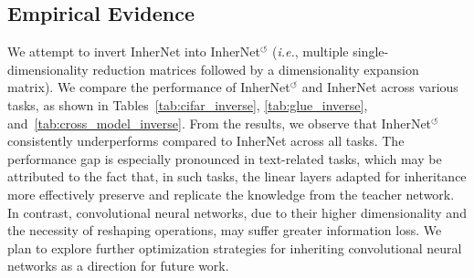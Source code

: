 \documentclass{article} %
\begin{document}
\subsection{Empirical Evidence}
\label{sec:evidence}

We attempt to invert InherNet into InherNet$^{\circlearrowleft}$ (\textit{i.e.}, multiple single-dimensionality reduction matrices followed by a dimensionality expansion matrix). We compare the performance of InherNet$^{\circlearrowleft}$ and InherNet across various tasks, as shown in Tables~\ref{tab:cifar_inverse}, \ref{tab:glue_inverse}, and~\ref{tab:cross_model_inverse}. From the results, we observe that InherNet$^{\circlearrowleft}$ consistently underperforms compared to InherNet across all tasks. The performance gap is especially pronounced in text-related tasks, which may be attributed to the fact that, in such tasks, the linear layers adapted for inheritance more effectively preserve and replicate the knowledge from the teacher network. In contrast, convolutional neural networks, due to their higher dimensionality and the necessity of reshaping operations, may suffer greater information loss. We plan to explore further optimization strategies for inheriting convolutional neural networks as a direction for future work.

\end{document}

